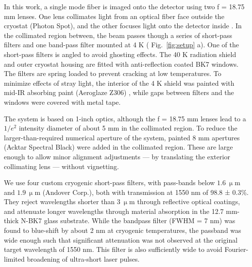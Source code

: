 \documentclass[11pt]{caltech_thesis} %
\begin{document}
In this work, a single mode fiber is imaged onto the detector using two f = 18.75 mm lenses. One lens collimates light from an optical fiber face outside the cryostat (Photon Spot), and the other focuses light onto the detector inside \autocite{Bellei:16}. In the collimated region between, the beam passes though a series of short-pass filters and one band-pass filter mounted at 4 K ( Fig.~\ref{fig:setup} a). One of the short-pass filters is angled to avoid ghosting effects. The 40 K radiation shield and outer cryostat housing are fitted with anti-reflection coated BK7 windows. The filters are spring loaded to prevent cracking at low temperatures. To minimize effects of stray light, the interior of the 4 K shield was painted with mid-IR absorbing paint (Aeroglaze Z306) \autocite{Persky1999}, while gaps between filters and the windows were covered with metal tape.

The system is based on 1-inch optics, although the f = 18.75 mm lenses lead to a $1/e^2$ intensity diameter of about 5 mm in the collimated region. To reduce the larger-than-required numerical aperture of the system, painted 8 mm apertures (Acktar Spectral Black) were added in the collimated region. These are large enough to allow minor alignment adjustments --- by translating the exterior collimating lens --- without vignetting.

We use four custom cryogenic short-pass filters, with pass-bands below $1.6 \ \mathrm{\upmu m}$ and $1.9 \ \mathrm{\upmu m}$ (Andover Corp.), both with transmission at 1550 nm of 98.8 ± 0.3\%. They reject wavelengths shorter than $3 \ \mathrm{\upmu m}$ through reflective optical coatings, and attenuate longer wavelengths through material absorption in the 12.7 mm-thick N-BK7 glass substrate. While the bandpass filter (FWHM = 7 nm) was found to blue-shift by about 2 nm at cryogenic temperatures, the passband was wide enough such that significant attenuation was not observed at the original target wavelength of 1550 nm. This filter is also sufficiently wide to avoid Fourier-limited broadening of ultra-short laser pulses.
\end{document}
